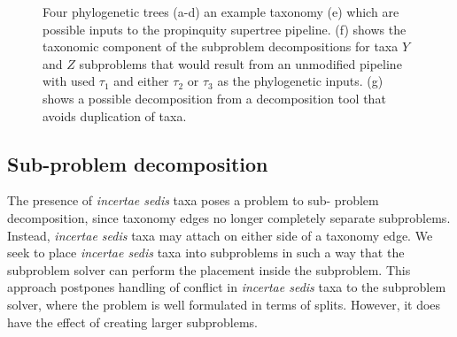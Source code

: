 \documentclass[english]{article}
\begin{document}
\begin{figure}


\caption{\label{fig:decomp} Four phylogenetic trees (a-d) an
example taxonomy (e) which are possible inputs to the propinquity supertree pipeline.
(f) shows the taxonomic component of the subproblem decompositions for taxa $Y$ and $Z$ subproblems 
that would result
from an unmodified pipeline with used $\tau_1$ and either $\tau_2$ or $\tau_3$ as the phylogenetic
inputs.
(g) shows a possible decomposition from a decomposition tool that avoids duplication of taxa.
}
\end{figure}





\subsection{Sub-problem decomposition}

The presence of \emph{incertae sedis }taxa poses a problem to sub-
problem decomposition, since taxonomy edges no longer completely
separate subproblems.
Instead, \emph{incertae sedis} taxa may attach
on either side of a taxonomy edge.
We seek to place \emph{incertae
sedis} taxa into subproblems in such a way that the subproblem solver
can perform the placement inside the subproblem.
This approach
postpones handling of conflict in \emph{incertae sedis} taxa to the
subproblem solver, where the problem is well formulated in terms of
splits.
However, it does have the effect of creating larger
subproblems.
\end{document}
